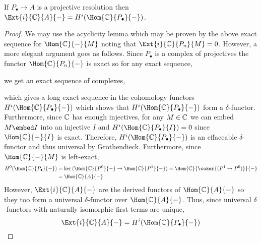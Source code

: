 \documentclass[12pt]{article}
\begin{document}
\begin{lemma}
If $P_\bullet \to A$ is a projective resolution then $\Ext{i}{\C}{A}{-} = H^i(\Hom{\C}{P_\bullet}{-})$. 
\end{lemma}

\begin{proof}
We may use the acyclicity lemma which may be proven by the above exact sequence for $\Hom{\C}{-}{M}$ noting that $\Ext{i}{\C}{P_n}{M} = 0$. However, a more elegant argument goes as follows. Since $P_\bullet$ is a complex of projectives the functor $\Hom{\C}{P_n}{-}$ is exact so for any exact sequence,
\begin{center}
\end{center}
we get an exact sequence of complexes,
\begin{center}
\end{center}
which gives a long exact sequence in the cohomology functors $H^i(\Hom{\C}{P_\bullet}{-})$ which shows that $H^i(\Hom{\C}{P_\bullet}{-})$ form a $\delta$-functor. Furthermore, since $\mathbb{C}$ has enough injectives, for any $M \in \mathbb{C}$ we can embed $M \embed I$ into an injective $I$ and $H^i(\Hom{\C}{P_\bullet}{I}) = 0$ since $\Hom{\C}{-}{I}$ is exact. Therefore,  $H^i(\Hom{\C}{P_\bullet}{-})$ is an effaceable $\delta$-functor and thus universal by Grothendieck. Furthermore, since $\Hom{\C}{-}{M}$ is left-exact,
\begin{align*}
H^0(\Hom{\C}{P_\bullet}{-}) & = \ker{(\Hom{\C}{P^0}{-} \to \Hom{\C}{P^1}{-})} = \Hom{\C}{\coker{(P^1 \to P^0)}}{-} 
\\
& = \Hom{\C}{A}{-} 
\end{align*}
However, $\Ext{i}{\C}{A}{-}$ are the derived functors of $\Hom{\C}{A}{-}$ so they too form a universal $\delta$-functor over $\Hom{\C}{A}{-}$. Thus, since universal $\delta$-functors with naturally isomorphic first terms are unique,
\[ \Ext{i}{\C}{A}{-} = H^i(\Hom{\C}{P_\bullet}{-}) \]
\end{proof}
\end{document}
